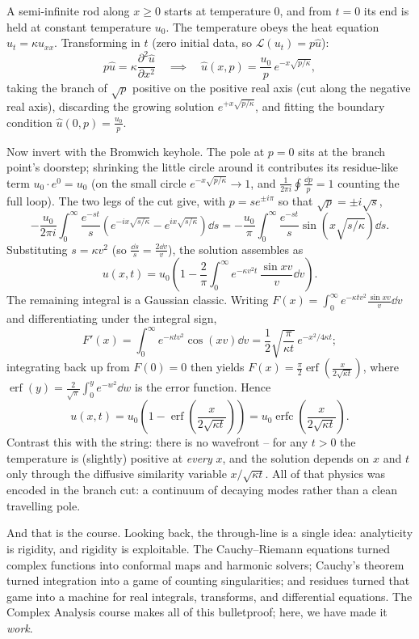 \begin{example}
	A semi-infinite rod along $x \geq 0$ starts at temperature $0$, and from $t = 0$ its end is held at constant temperature $u_0$. The temperature obeys the heat equation $u_t = \kappa u_{xx}$. Transforming in $t$ (zero initial data, so $\mathcal L(u_t) = p \hat u$):
	$$
	p \hat u = \kappa \frac{\partial^2 \hat u}{\partial x^2}
	\quad\implies\quad
	\hat u(x, p) = \frac{u_0}{p}\, e^{-x\sqrt{p/\kappa}},
	$$
	taking the branch of $\sqrt p$ positive on the positive real axis (cut along the negative real axis), discarding the growing solution $e^{+x\sqrt{p/\kappa}}$, and fitting the boundary condition $\hat u(0, p) = \frac{u_0}{p}$.

	Now invert with the Bromwich keyhole. The pole at $p = 0$ sits at the branch point's doorstep; shrinking the little circle around it contributes its residue-like term $u_0 \cdot e^{0} = u_0$ (on the small circle $e^{-x\sqrt{p/\kappa}} \to 1$, and $\frac{1}{2\pi i}\oint \frac{\dd p}{p} = 1$ counting the full loop). The two legs of the cut give, with $p = se^{\pm i\pi}$ so that $\sqrt{p} = \pm i \sqrt s$,
	$$
	-\frac{u_0}{2\pi i} \int_0^\infty \frac{e^{-st}}{s}\left(e^{-ix\sqrt{s/\kappa}} - e^{ix\sqrt{s/\kappa}}\right) \dd s
	= -\frac{u_0}{\pi} \int_0^\infty \frac{e^{-st}}{s} \sin\left(x\sqrt{s/\kappa}\right) \dd s.
	$$
	Substituting $s = \kappa v^2$ (so $\frac{\dd s}{s} = \frac{2 \dd v}{v}$), the solution assembles as
	$$
	u(x, t) = u_0\left(1 - \frac{2}{\pi}\int_0^\infty e^{-\kappa v^2 t}\, \frac{\sin xv}{v} \dd v\right).
	$$
	The remaining integral is a Gaussian classic. Writing $F(x) = \int_0^\infty e^{-\kappa t v^2} \frac{\sin xv}{v} \dd v$ and differentiating under the integral sign,
	$$
	F'(x) = \int_0^\infty e^{-\kappa t v^2}\cos(xv) \dd v = \frac 12 \sqrt{\frac{\pi}{\kappa t}}\, e^{-x^2/4\kappa t};
	$$
	integrating back up from $F(0) = 0$ then yields $F(x) = \frac{\pi}{2}\operatorname{erf}\left(\frac{x}{2\sqrt{\kappa t}}\right)$, where $\operatorname{erf}(y) = \frac{2}{\sqrt \pi}\int_0^y e^{-w^2}\dd w$ is the error function. Hence
	$$
	u(x, t) = u_0 \left(1 - \operatorname{erf}\left(\frac{x}{2\sqrt{\kappa t}}\right)\right) = u_0 \operatorname{erfc}\left(\frac{x}{2\sqrt{\kappa t}}\right).
	$$
	Contrast this with the string: there is no wavefront -- for any $t > 0$ the temperature is (slightly) positive at \emph{every} $x$, and the solution depends on $x$ and $t$ only through the diffusive similarity variable $x/\sqrt{\kappa t}$. All of that physics was encoded in the branch cut: a continuum of decaying modes rather than a clean travelling pole.
\end{example}

And that is the course. Looking back, the through-line is a single idea: analyticity is rigidity, and rigidity is exploitable. The Cauchy--Riemann equations turned complex functions into conformal maps and harmonic solvers; Cauchy's theorem turned integration into a game of counting singularities; and residues turned that game into a machine for real integrals, transforms, and differential equations. The Complex Analysis course makes all of this bulletproof; here, we have made it \emph{work}.

